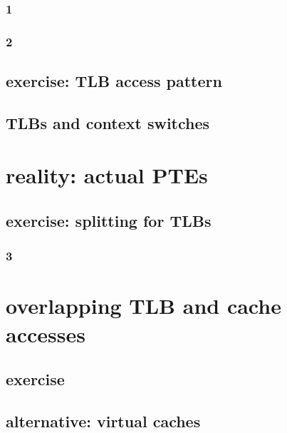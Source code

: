 \subsubsection{1}

\subsubsection{2}



\subsection{exercise: TLB access pattern}




\subsection{TLBs and context switches}


\section{reality: actual PTEs}



\subsection{exercise: splitting for TLBs}
\subsubsection{3}


\section{overlapping TLB and cache accesses}


\subsection{exercise}


\subsection{alternative: virtual caches}



